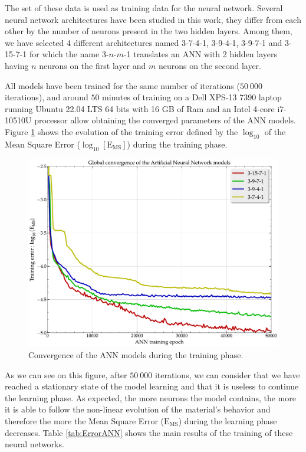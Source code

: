 \documentclass[algorithms,article,submit,pdftex,moreauthors]{Definitions/mdpi}
\DeclareRobustCommand{\MSE}{\text{E}_\text{MS}}
\begin{document}
The set of these data is used as training data for the neural network.
Several neural network architectures have been studied in this work, they differ from each other by the number of neurons present in the two hidden layers.
Among them, we have selected 4 different architectures named 3-7-4-1, 3-9-4-1, 3-9-7-1 and 3-15-7-1 for which the name 3-$n$-$m$-1 translates an ANN with 2 hidden layers having $n$ neurons on the first layer and $m$ neurons on the second layer.

All models have been trained for the same number of iterations ($50~000$ iterations), and around $50$ minutes of training on a Dell XPS-13 7390 laptop running Ubuntu 22.04 LTS 64 bits with 16 GB of Ram and an Intel 4-core i7-10510U processor allow obtaining the converged parameters of the ANN models.
Figure \ref{fig:Convergence-ANN} shows the evolution of the training error defined by the $\log_{10}$ of the Mean Square Error ($\log_{10}\left[\MSE\right]$) during the training phase.
\begin{figure}[!ht]
\centering
\includegraphics[width=0.9\columnwidth]{Figures/Convergence-ANN}
\caption{Convergence of the ANN models during the training phase.}
\label{fig:Convergence-ANN}
\end{figure}
As we can see on this figure, after $50~000$ iterations, we can consider that we have reached a stationary state of the model learning and that it is useless to continue the learning phase.
As expected, the more neurons the model contains, the more it is able to follow the non-linear evolution of the material's behavior and therefore the more the Mean Square Error ($\MSE$) during the learning phase decreases.
Table \ref{tab:ErrorANN} shows the main results of the training of these neural networks.
\end{document}
